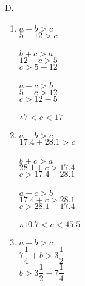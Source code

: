 \begin{multicols}{2}

D. 
\begin{enumerate}[label = \arabic*. ]
\item $ a+b>c $ \redcheck \\
$ 5+12 > c$ \redcheck \\
 \redcheck \\

$ b+c>a $ \redcheck \\
$ 12+c >5 $ \redcheck \\
$ c>5 -12 $ \redcheck \\
 \redcheck \\

$ a+c>b $ \redcheck \\
$ 5+c > 12$ \redcheck \\
$ c> 12-5 $ \redcheck \\
 \redcheck \\

$\therefore 7< c<17 $ \redcheck 

\item $ a+b>c $ \redcheck \\
$ 17.4+28.1 >c $ \redcheck \\
 \redcheck \\

$ b+c>a $ \redcheck \\
$ 28.1+ c>17.4 $ \redcheck \\
$ c>17.4 -28.1 $ \redcheck \\
 \redcheck \\

$ a+c>b $ \redcheck \\
$ 17.4+c >28.1 $ \redcheck \\
$ c>28.1 -17.4 $ \redcheck \\
 \redcheck \\

$\therefore 10.7< c<45.5 $ \redcheck 
\item $ a+b>c $ \redcheck \\
$ 7\dfrac{1}{4} +b > 3\dfrac{1}{2} $ \redcheck \\
$ b>3\dfrac{1}{2} -7\dfrac{1}{4} $ \redcheck \\
 \redcheck \\


\end{enumerate}
\end{multicols}
